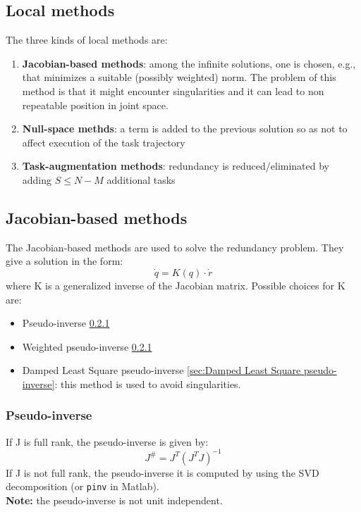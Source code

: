 \documentclass[a4paper,12pt]{article}
\begin{document}
\subsection{Local methods}
The three kinds of local methods are:
\begin{enumerate}
    \item \textbf{Jacobian-based methods}: among the infinite solutions,
     one is chosen, e.g., that minimizes a
    suitable (possibly weighted) norm. The problem of this method is that it 
    might encounter singularities and it can lead to non repeatable position 
    in joint space.
    \item \textbf{Null-space methds}: a term is added to the previous 
    solution so as not to affect execution of the task trajectory
    \item \textbf{Task-augmentation methods}: redundancy is 
    reduced/eliminated by adding $S \leq N - M$ additional tasks
\end{enumerate}
\subsection{Jacobian-based methods}
The Jacobian-based methods are used to solve the redundancy problem.
They give a solution in the form: \begin{equation}
    \dot{q} = K(q) \cdot \dot{r}
\end{equation}
where K is a generalized inverse of the Jacobian matrix. Possible 
choices for K are:
\begin{itemize}
    \item Pseudo-inverse \ref{sec:Pseudo-inverse}
    \item Weighted pseudo-inverse \ref{sec:Pseudo-inverse}
    \item Damped Least Square pseudo-inverse \ref{sec:Damped Least Square pseudo-inverse}:
     this method is used to avoid singularities.
\end{itemize}
    \subsubsection{Pseudo-inverse}\label{sec:Pseudo-inverse}
If J is full rank, the pseudo-inverse is given by:
\begin{equation}
    J^\# = J^T(J^T J)^{-1} 
\end{equation}
If J is not full rank, the pseudo-inverse it 
is computed by using the SVD decomposition (or \verb|pinv| in Matlab).\\
\textbf{Note:} the pseudo-inverse is not unit independent.
\end{document}
